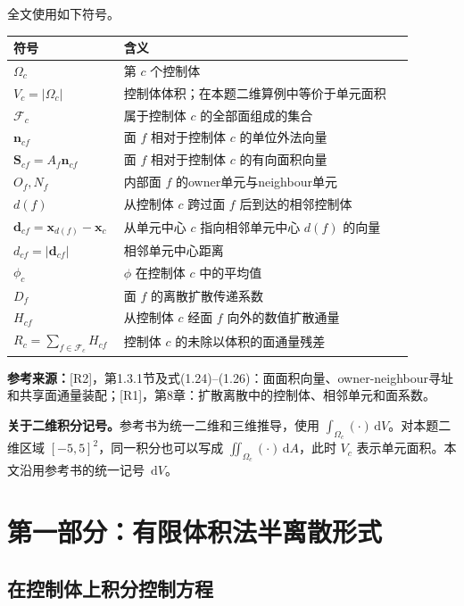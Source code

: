 \documentclass[UTF8,12pt,a4paper]{ctexart}
\numberwithin{equation}{section}
\newcommand{\Rone}{\textnormal{[R1]}}
\newcommand{\Rtwo}{\textnormal{[R2]}}
\newcommand{\source}[1]{%
  \par\smallskip
  \noindent\colorbox{sourcebg}{%
    \parbox{0.955\linewidth}{\raggedright\footnotesize\color{sourcegray}\textbf{参考来源：}#1}%
  }
  \par\smallskip
}
\newcommand{\dd}{\,\mathrm d}
\newcommand{\Sf}{\bm S}
\newcommand{\xf}{\bm x}
\begin{document}
全文使用如下符号。
\begin{longtable}{>{\centering\arraybackslash}p{0.20\linewidth}p{0.69\linewidth}}
\toprule
符号 & 含义\\
\midrule
$\Omega_c$ & 第 $c$ 个控制体\\
$V_c=|\Omega_c|$ & 控制体体积；在本题二维算例中等价于单元面积\\
$\mathcal F_c$ & 属于控制体 $c$ 的全部面组成的集合\\
$\bm n_{cf}$ & 面 $f$ 相对于控制体 $c$ 的单位外法向量\\
$\Sf_{cf}=A_f\bm n_{cf}$ & 面 $f$ 相对于控制体 $c$ 的有向面积向量\\
$O_f,N_f$ & 内部面 $f$ 的owner单元与neighbour单元\\
$d(f)$ & 从控制体 $c$ 跨过面 $f$ 后到达的相邻控制体\\
$\bm d_{cf}=\xf_{d(f)}-\xf_c$ & 从单元中心 $c$ 指向相邻单元中心 $d(f)$ 的向量\\
$d_{cf}=|\bm d_{cf}|$ & 相邻单元中心距离\\
$\phi_c$ & $\phi$ 在控制体 $c$ 中的平均值\\
$D_f$ & 面 $f$ 的离散扩散传递系数\\
$H_{cf}$ & 从控制体 $c$ 经面 $f$ 向外的数值扩散通量\\
$R_c=\sum_{f\in\mathcal F_c}H_{cf}$ & 控制体 $c$ 的未除以体积的面通量残差\\
\bottomrule
\end{longtable}

\source{\Rtwo，第1.3.1节及式(1.24)--(1.26)：面面积向量、owner-neighbour寻址和共享面通量装配；\Rone，第8章：扩散离散中的控制体、相邻单元和面系数。}

\noindent\textbf{关于二维积分记号。}参考书为统一二维和三维推导，使用 $\int_{\Omega_c}(\cdot)\dd V$。对本题二维区域 $[-5,5]^2$，同一积分也可以写成 $\iint_{\Omega_c}(\cdot)\dd A$，此时 $V_c$ 表示单元面积。本文沿用参考书的统一记号 $\dd V$。

\newpage
\section{第一部分：有限体积法半离散形式}

\subsection{在控制体上积分控制方程}
\end{document}
